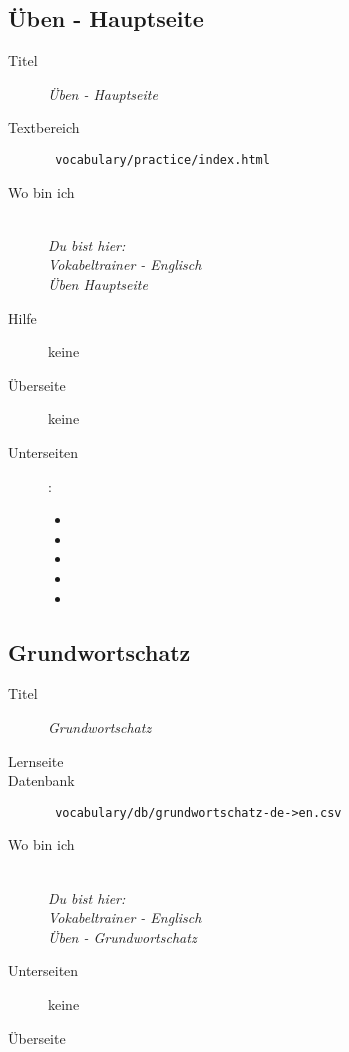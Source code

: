 \subsection{ Üben - Hauptseite }
\label{has:voc-practice-page0}
\begin{description}
	\item[Titel] \emph{ Üben - Hauptseite }
	\item[Textbereich] \texttt{ vocabulary/practice/index.html }
	\item[Wo bin ich] \emph{\\Du bist hier:\\Vokabeltrainer - Englisch\\Üben Hauptseite}
	\item[Hilfe] keine
	\item[Überseite] keine
	\item[Unterseiten] :
	\begin{itemize}
		\item {}
		\item {}
		\item {}
		\item {}
		\item {}
	\end{itemize}
\end{description}

\subsection{ Grundwortschatz }
\label{has:voc-practice-page1}
\begin{description}
	\item[Titel] \emph{ Grundwortschatz }
	\item[Lernseite] 
	\item[Datenbank] \texttt{ vocabulary/db/grundwortschatz-de->en.csv }
	\item[Wo bin ich] \emph{\\Du bist hier:\\Vokabeltrainer - Englisch\\Üben - Grundwortschatz}
	\item[Unterseiten] keine
	\item[Überseite] 
\end{description}

